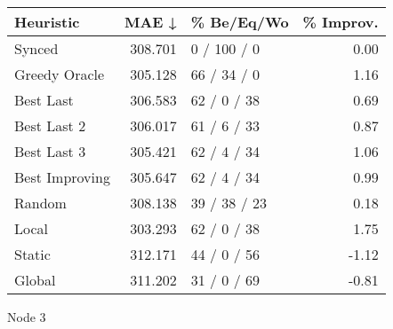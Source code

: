 \begin{tabular}{lrlr}
\toprule
\textbf{Heuristic} & \textbf{MAE ↓} & \textbf{\% Be/Eq/Wo} & \textbf{\% Improv.} \\
\midrule
            Synced &        308.701 &          0 / 100 / 0 &                0.00 \\
     Greedy Oracle &        305.128 &          66 / 34 / 0 &                1.16 \\
         Best Last &        306.583 &          62 / 0 / 38 &                0.69 \\
       Best Last 2 &        306.017 &          61 / 6 / 33 &                0.87 \\
       Best Last 3 &        305.421 &          62 / 4 / 34 &                1.06 \\
    Best Improving &        305.647 &          62 / 4 / 34 &                0.99 \\
            Random &        308.138 &         39 / 38 / 23 &                0.18 \\
             Local &        303.293 &          62 / 0 / 38 &                1.75 \\
            Static &        312.171 &          44 / 0 / 56 &               -1.12 \\
            Global &        311.202 &          31 / 0 / 69 &               -0.81 \\
\bottomrule
\end{tabular}
\caption{Node 3}
\label{tab:iid_lr01_le2_bs4_3}
